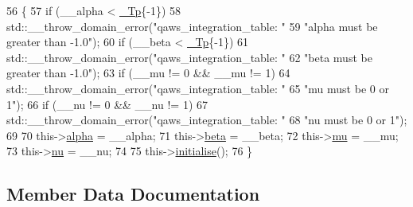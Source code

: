 \begin{DoxyCode}
56     \{
57       \textcolor{keywordflow}{if} (\_\_alpha < \hyperlink{namespace____gnu__cxx_a3b19a9c800ca194374ef9172290f7d79}{\_Tp}\{-1\})
58         std::\_\_throw\_domain\_error(\textcolor{stringliteral}{"qaws\_integration\_table: "}
59                                   \textcolor{stringliteral}{"alpha must be greater than -1.0"});
60       \textcolor{keywordflow}{if} (\_\_beta < \hyperlink{namespace____gnu__cxx_a3b19a9c800ca194374ef9172290f7d79}{\_Tp}\{-1\})
61         std::\_\_throw\_domain\_error(\textcolor{stringliteral}{"qaws\_integration\_table: "}
62                                   \textcolor{stringliteral}{"beta must be greater than -1.0"});
63       \textcolor{keywordflow}{if} (\_\_mu != 0 && \_\_mu != 1)
64         std::\_\_throw\_domain\_error(\textcolor{stringliteral}{"qaws\_integration\_table: "}
65                                   \textcolor{stringliteral}{"mu must be 0 or 1"});
66       \textcolor{keywordflow}{if} (\_\_nu != 0 && \_\_nu != 1)
67         std::\_\_throw\_domain\_error(\textcolor{stringliteral}{"qaws\_integration\_table: "}
68                                   \textcolor{stringliteral}{"nu must be 0 or 1"});
69 
70       this->\hyperlink{struct____gnu__cxx_1_1qaws__integration__table_a22b7131c633fe090ec1055d51b486bc0}{alpha} = \_\_alpha;
71       this->\hyperlink{struct____gnu__cxx_1_1qaws__integration__table_ad7cdd51af800d8830907d0718035753c}{beta} = \_\_beta;
72       this->\hyperlink{struct____gnu__cxx_1_1qaws__integration__table_a27e7db2fb032dc33759509c9c55546dc}{mu} = \_\_mu;
73       this->\hyperlink{struct____gnu__cxx_1_1qaws__integration__table_acc78257f8dffad045fe66a13b9c7c434}{nu} = \_\_nu;
74 
75       this->\hyperlink{struct____gnu__cxx_1_1qaws__integration__table_a72d9ce0c313049e00eb9aaf4502161ea}{initialise}();
76     \}
\end{DoxyCode}


\subsection{Member Data Documentation}
\mbox{\label{struct____gnu__cxx_1_1qaws__integration__table_a22b7131c633fe090ec1055d51b486bc0}} 
